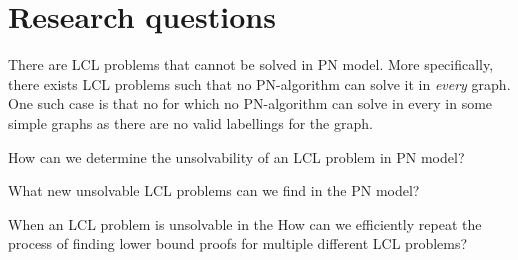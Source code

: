 
\section{Research questions} \label{sec:research_question}

There are LCL problems that cannot be solved in PN model.
More specifically, there exists LCL problems such that no PN-algorithm can solve it in \emph{every} graph.
One such case is that no
for which no PN-algorithm can solve in every  in some simple graphs as there are no valid labellings for the graph.

How can we determine the unsolvability of an LCL problem in PN model?

What new unsolvable LCL problems can we find in the PN model? 

When an LCL problem is unsolvable in the 
How can we efficiently repeat the process of finding lower bound proofs for multiple different LCL problems?

